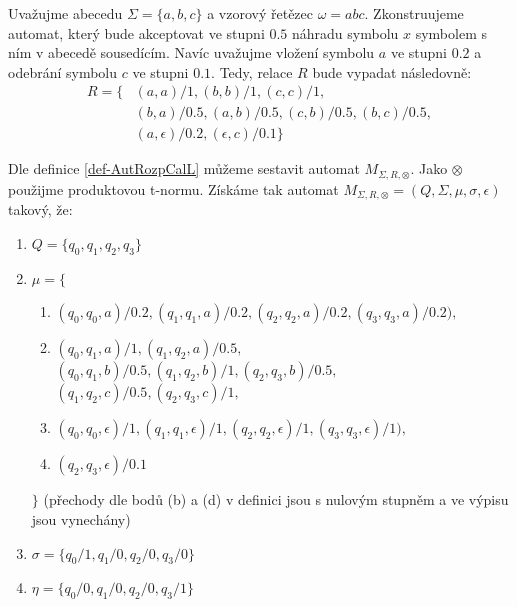\documentclass[a4paper,10pt]{article}
\begin{document}
\begin{example} \label{ex-AutRozpCalL}
 Uvažujme abecedu $\Sigma = \{a, b, c\}$ a vzorový řetězec $\omega = abc$. Zkonstruujeme automat, který bude akceptovat ve stupni $0.5$ náhradu symbolu $x$ symbolem s ním v abecedě sousedícím. Navíc uvažujme vložení symbolu $a$ ve stupni $0.2$ a odebrání symbolu $c$ ve stupni $0.1$. Tedy, relace $R$ bude vypadat následovně:
 \begin{align*}
  R = \{ 
   & (a, a)/1, (b, b)/1, (c, c)/1, \\
   & (b, a)/0.5, (a, b)/0.5, (c, b)/0.5, (b, c)/0.5, \\
   & (a, \epsilon)/0.2, (\epsilon, c)/0.1 \}
 \end{align*}

 Dle definice \ref{def-AutRozpCalL} můžeme sestavit automat $M_{\Sigma, R, \otimes}$. Jako $\otimes$ použijme produktovou t-normu. Získáme tak automat $M_{\Sigma, R, \otimes} = (Q, \Sigma, \mu, \sigma, \epsilon)$ takový, že:
  \begin{enumerate}
  \item $Q = \{ q_0, q_1, q_2, q_3 \}$
  \item $\mu = \{ $
  \begin{enumerate}
   
   \item $(q_0, q_0, a)/0.2, (q_1, q_1, a)/0.2, (q_2, q_2, a)/0.2, (q_3, q_3, a)/0.2),$
   \item $(q_0, q_1, a)/1, (q_1, q_2, a)/0.5,$ \\
   $(q_0, q_1, b)/0.5, (q_1, q_2, b)/1, (q_2, q_3, b)/0.5,$ \\
   $(q_1, q_2, c)/0.5, (q_2, q_3, c)/1,$
   \addtocounter{enumii}{1} %
   \item $(q_0, q_0, \epsilon)/1, (q_1, q_1, \epsilon)/1, (q_2, q_2, \epsilon)/1, (q_3, q_3, \epsilon)/1),$
   \item $(q_2, q_3, \epsilon)/0.1$
   \addtocounter{enumii}{1} %
  \end{enumerate}
  $ \} $ (přechody dle bodů (b) a (d) v definici jsou s nulovým stupněm a ve výpisu jsou vynechány)
  \item $\sigma = \{ q_0/1, q_1/0, q_2/0, q_3/0  \}$
  \item $\eta = \{ q_0/0, q_1/0, q_2/0, q_3/1  \}$
  \\ 
 \end{enumerate}


\end{example}
\end{document}
